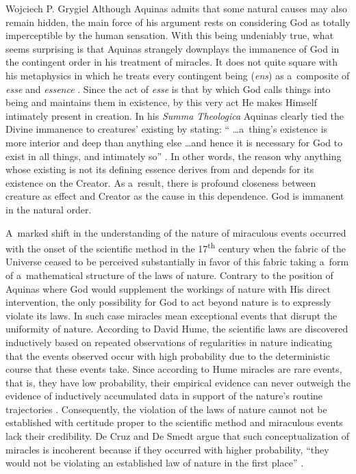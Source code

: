 \begin{artengenv}{Wojciech P. Grygiel}
Although Aquinas admits that some natural causes may also remain hidden, the main force of his argument rests on considering God as totally imperceptible by the human sensation. With this being undeniably true, what seems surprising is that Aquinas strangely downplays the immanence of God in the contingent order in his treatment of miracles. It does not quite square with his metaphysics in which he treats every contingent being (\textit{ens}) as a~composite of \textit{esse} and \textit{essence}
\parencite[][]{aquinas_being_1968}. %
 Since the act of \textit{esse} is that by which God calls things into being and maintains them in existence, by this very act He makes Himself intimately present in creation. In his \textit{Summa Theologica} Aquinas clearly tied the Divine immanence to creatures’ existing by stating: `` \ldots a~thing’s existence is more interior and deep than anything else \ldots and hence it is necessary for God to exist in all things, and intimately so'' 
\parencite[][\textit{Summa Theologica}, I.8.1]{aquinas_summa_1981}. %
 In other words, the reason why anything whose existing is not its defining essence derives from and depends for its existence on the Creator. As a~result, there is profound closeness between creature as effect and Creator as the cause in this dependence. God is immanent in the natural order.

A~marked shift in the understanding of the nature of miraculous events occurred with the onset of the scientific method in the 17\textsuperscript{th} century when the fabric of the Universe ceased to be perceived substantially in favor of this fabric taking a~form of a~mathematical structure of the laws of nature. Contrary to the position of Aquinas where God would supplement the workings of nature with His direct intervention, the only possibility for God to act beyond nature is to expressly violate its laws. In such case miracles mean exceptional events that disrupt the uniformity of nature. According to David Hume, the scientific laws are discovered inductively based on repeated observations of regularities in nature indicating that the events observed occur with high probability due to the deterministic course that these events take. Since according to Hume miracles are rare events, that is, they have low probability, their empirical evidence can never outweigh the evidence of inductively accumulated data in support of the nature’s routine trajectories
\parencite[][pp.79–95]{hume_enquiry_2008}. %
 Consequently, the violation of the laws of nature cannot not be established with certitude proper to the scientific method and miraculous events lack their credibility. De Cruz and De Smedt argue that such conceptualization of miracles is incoherent because if they occurred with higher probability, ``they would not be violating an established law of nature in the first place'' 
\parencite[][p.159]{de_cruz_natural_2015}.%



\end{artengenv}
